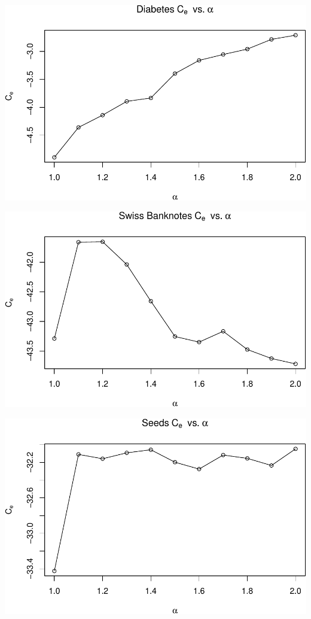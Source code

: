 \begin{center}\includegraphics[width=1\linewidth]{Report_files/figure-latex/unnamed-chunk-20-3} \end{center}

\begin{center}\includegraphics[width=1\linewidth]{Report_files/figure-latex/unnamed-chunk-20-4} \end{center}

\begin{center}\includegraphics[width=1\linewidth]{Report_files/figure-latex/unnamed-chunk-20-5} \end{center}

